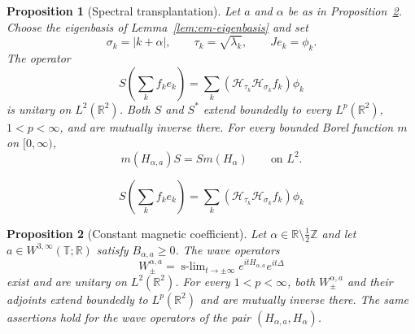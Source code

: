 \documentclass[10pt,a4paper]{amsart}
\newtheorem{proposition}{Proposition}
\newcommand{\HH}{\mathcal H}                 %
\newcommand{\R}{\mathbb R}
\newcommand{\T}{\mathbb T}
\newcommand{\Z}{\mathbb Z}
\DeclareMathOperator*{\slim}{s\text{-}lim}
\begin{document}
\begin{proposition}[Spectral transplantation]
\label{prop:em-transplantation}
  Let $a$ and $\alpha$ be as in
  Proposition~\ref{prop:em-wave}. Choose the eigenbasis of
  Lemma~\ref{lem:em-eigenbasis} and set
  \begin{equation*}
    \sigma_k=|k+\alpha|,\qquad \tau_k=\sqrt{\lambda_k},
    \qquad Je_k=\phi_k.
  \end{equation*}
  The operator
  \begin{equation}\label{eq:em-S}
    S\left(\sum_k f_ke_k\right)
    =\sum_k(\HH_{\tau_k}\HH_{\sigma_k}f_k)\phi_k
  \end{equation}
  is unitary on $L^2(\R^2)$. Both $S$ and $S^*$ extend
  boundedly to every $L^p(\R^2)$, $1<p<\infty$, and are
  mutually inverse there. For every bounded Borel function
  $m$ on $[0,\infty)$,
  \begin{equation*}
    m(H_{\alpha,a})S=Sm(H_\alpha)\qquad\text{on }L^2.
  \end{equation*}
\end{proposition}

  \begin{equation}
    S\left(\sum_k f_ke_k\right)
    =\sum_k(\HH_{\tau_k}\HH_{\sigma_k}f_k)\phi_k
  \end{equation}

\begin{proposition}[Constant magnetic coefficient]
\label{prop:em-wave}
  Let $\alpha\in\R\setminus\frac12\Z$ and let
  $a\in W^{3,\infty}(\T;\R)$ satisfy $B_{\alpha,a}\ge0$.
  The wave operators
  \begin{equation}\label{eq:em-wave}
    W_\pm^{\alpha,a}
    =\slim_{t\to\pm\infty}e^{itH_{\alpha,a}}e^{it\Delta}
  \end{equation}
  exist and are unitary on $L^2(\R^2)$. For every
  $1<p<\infty$, both $W_\pm^{\alpha,a}$ and their
  adjoints extend boundedly to $L^p(\R^2)$ and are mutually
  inverse there. The same assertions hold for the wave
  operators of the pair $(H_{\alpha,a},H_\alpha)$.
\end{proposition}
\end{document}
